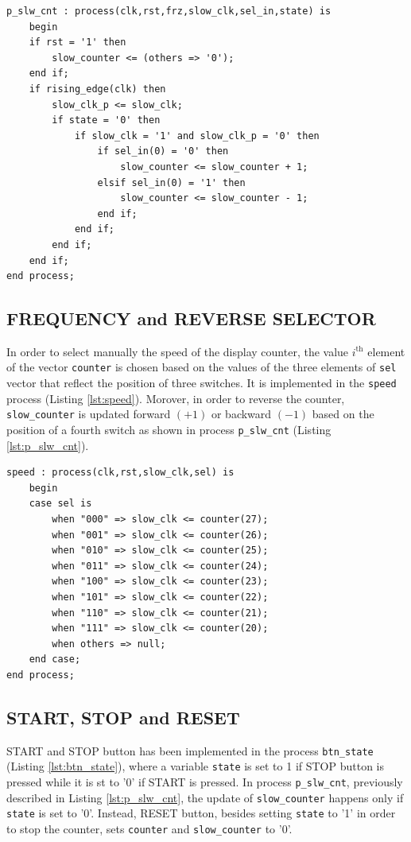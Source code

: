 \documentclass[11pt, a4paper]{article}
\begin{document}
\begin{lstlisting}[style=vhdl,label={lst:p_slw_cnt},caption={\texttt{p\_slw\_cnt} process.}]
p_slw_cnt : process(clk,rst,frz,slow_clk,sel_in,state) is
    begin
    if rst = '1' then
        slow_counter <= (others => '0');
    end if;
    if rising_edge(clk) then
        slow_clk_p <= slow_clk;
        if state = '0' then
            if slow_clk = '1' and slow_clk_p = '0' then
                if sel_in(0) = '0' then
                    slow_counter <= slow_counter + 1;
                elsif sel_in(0) = '1' then
                    slow_counter <= slow_counter - 1;
                end if;
            end if;
        end if;
    end if;
end process;\end{lstlisting}

\subsection{FREQUENCY and REVERSE SELECTOR}
In order to select manually the speed of the display counter, the value \(i^\text{th}\) element of the vector {\footnotesize\texttt{counter}} is chosen based on the values of the three elements of {\footnotesize\texttt{sel}} vector that reflect the position of three switches. It is implemented in the {\footnotesize\texttt{speed}} process (Listing \ref{lst:speed}).
Morover, in order to reverse the counter, {\footnotesize\texttt{slow\_counter}} is updated forward \( (+1)\) or backward \((-1)\) based on the position of a fourth switch as shown in process {\footnotesize\texttt{p\_slw\_cnt}} (Listing \ref{lst:p_slw_cnt}).

\begin{lstlisting}[style=vhdl,label={lst:speed},caption={\texttt{speed} process.}]
speed : process(clk,rst,slow_clk,sel) is
    begin
    case sel is
        when "000" => slow_clk <= counter(27);
        when "001" => slow_clk <= counter(26);
        when "010" => slow_clk <= counter(25);
        when "011" => slow_clk <= counter(24);
        when "100" => slow_clk <= counter(23);
        when "101" => slow_clk <= counter(22);
        when "110" => slow_clk <= counter(21);
        when "111" => slow_clk <= counter(20);
        when others => null;
    end case;
end process;\end{lstlisting}

\subsection{START, STOP and RESET}
START and STOP button has been implemented in the process {\footnotesize\texttt{btn\_state}} (Listing \ref{lst:btn_state}), where a variable {\footnotesize\texttt{state}} is set to 1 if STOP button is pressed while it is st to '0' if START is pressed.
In process {\footnotesize\texttt{p\_slw\_cnt}}, previously described in Listing \ref{lst:p_slw_cnt}, the update of {\footnotesize\texttt{slow\_counter}} happens only if {\footnotesize\texttt{state}} is set to '0'. Instead, RESET button, besides setting {\footnotesize\texttt{state}} to '1' in order to stop the counter, sets {\footnotesize\texttt{counter}} and {\footnotesize\texttt{slow\_counter}} to '0'.
\end{document}
